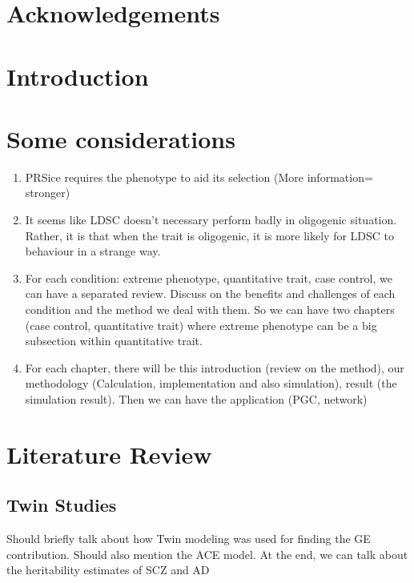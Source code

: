 \documentclass{book}
\begin{document}
	\chapter*{Acknowledgements}
	\cleardoublepage
	\begin{singlespace}
	\printglossary[title=Abbreviations,toctitle=Abbreviations]
	\cleardoublepage
	
	\cleardoublepage
		\tableofcontents
		\listoffigures
	\end{singlespace}
\mainmatter
	\chapter*{Introduction}
	\pagestyle{fancy}
	\chapter*{Some considerations}
	\begin{enumerate}
		\item PRSice requires the phenotype to aid its selection (More information= stronger)
		\item It seems like LDSC doesn't necessary perform badly in oligogenic situation.
		Rather, it is that when the trait is oligogenic, it is more likely for LDSC to behaviour in a strange way.
		\item For each condition: extreme phenotype, quantitative trait, case control, we can have a separated review. 
		Discuss on the benefits and challenges of each condition and the method we deal with them.
		So we can have two chapters (case control, quantitative trait) where extreme phenotype can be a big subsection within quantitative trait.
		\item For each chapter, there will be this introduction (review on the method), our methodology (Calculation, implementation and also simulation), result (the simulation result). 
		Then we can have the application (PGC, network)
	\end{enumerate}
	
	\chapter{Literature Review}
	\section{Twin Studies}
	Should briefly talk about how Twin modeling was used for finding the GE contribution.
	Should also mention the ACE model.
	At the end, we can talk about the heritability estimates of SCZ and AD
\end{document}
